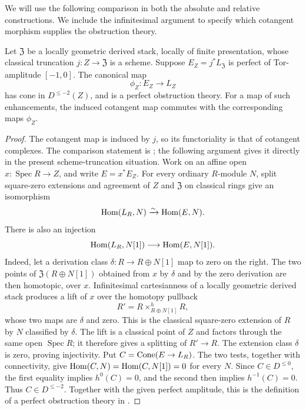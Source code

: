 We will use the following comparison in both the absolute and relative
constructions.  We include the infinitesimal argument to specify which
cotangent morphism supplies the obstruction theory.

\begin{lemma}\label{der:truncation}
Let $\mathfrak Z$ be a locally geometric derived stack, locally of finite
presentation, whose classical truncation $j:Z\to\mathfrak Z$ is a scheme.
Suppose $E_Z=j^*L_{\mathfrak Z}$ is perfect of Tor-amplitude $[-1,0]$.
The canonical map
\[
\phi_Z:E_Z\longrightarrow L_Z
\]
has cone in $D^{\leq-2}(Z)$, and is a perfect obstruction theory.
For a map of such enhancements, the induced cotangent map commutes with
the corresponding maps $\phi_Z$.
\end{lemma}

\begin{proof}
The cotangent map is induced by $j$, so its functoriality is that of
cotangent complexes.  The comparison statement is
\cite[Proposition~1.2 and Corollary~1.4]{STV}; the following argument gives
it directly in the present scheme-truncation situation.
Work on an affine open $x:\operatorname{Spec}R\to Z$, and write
$E=x^*E_Z$.  For every ordinary $R$-module $N$, split square-zero
extensions and agreement of $Z$ and $\mathfrak Z$ on classical rings give
an isomorphism
\[
\operatorname{Hom}(L_R,N)\xrightarrow{\sim}\operatorname{Hom}(E,N).
\]
There is also an injection
\[
\operatorname{Hom}(L_R,N[1])\longrightarrow\operatorname{Hom}(E,N[1]).
\]
Indeed, let a derivation class $\delta:R\to R\oplus N[1]$ map to zero
on the right.  The two points of $\mathfrak Z(R\oplus N[1])$ obtained
from $x$ by $\delta$ and by the zero derivation are then homotopic, over
$x$.  Infinitesimal cartesianness of a locally geometric derived stack
produces a lift of $x$ over the homotopy pullback
\[
R'=R\mathbin{\times^h_{R\oplus N[1]}}R,
\]
whose two maps are $\delta$ and zero.  This is the classical square-zero
extension of $R$ by $N$ classified by $\delta$.  The lift is a classical
point of $Z$ and factors through the same open $\operatorname{Spec}R$;
it therefore gives a splitting of $R'\to R$.  The extension class
$\delta$ is zero, proving injectivity.
Put $C=\operatorname{Cone}(E\to L_R)$.  The two tests, together with connectivity,
give $\operatorname{Hom}(C,N)=\operatorname{Hom}(C,N[1])=0$ for every $N$.  Since $C\in D^{\leq0}$,
the first equality implies $h^0(C)=0$, and the second then implies
$h^{-1}(C)=0$.  Thus $C\in D^{\leq-2}$.  Together with the
given perfect amplitude, this is the definition of a perfect obstruction
theory in \cite[Definitions~4.4 and~5.1]{BF}.
\end{proof}

